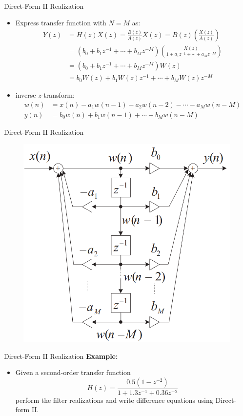 \documentclass[pdflatex,compress,mathserif]{beamer}
\begin{document}
\begin{frame}{Direct-Form II Realization}
	\begin{itemize}
		\item Express transfer function with $N = M$ as:
		\begin{align*}
      Y(z) &= H(z) X(z) = \frac{B(z)}{A(z)} X(z) = B(z)\left( \frac{X(z)}{A(z)} \right) \\
      &= (b_0 + b_1 z^{-1} + \cdots + b_M z^{-M}) \left( \frac{X(z)}{1 + a_1 z^{-1} + \cdots + a_M z^{-M}} \right) \\
      &= (b_0 + b_1 z^{-1} + \cdots + b_M z^{-M}) W(z) \\
      &= b_0 W(z) + b_1 W(z) z^{-1} + \cdots + b_M W(z) z^{-M}
    \end{align*}
    \item inverse $z$-transform:
    \begin{align*}
      w(n) &= x(n) - a_1 w(n-1) - a_2 w(n-2) - \cdots - a_M w(n-M) \\
      y(n) &= b_0 w(n) + b_1 w(n-1) + \cdots + b_M w(n-M)
    \end{align*}
	\end{itemize}
\end{frame}

\begin{frame}{Direct-Form II Realization}
    \begin{figure}
      \centering
			\includegraphics[width=0.6\linewidth]{./img/img04.png}
		\end{figure}
\end{frame}

\begin{frame}{Direct-Form II Realization}
  \textbf{Example:}
  \begin{itemize}
    \item Given a second-order transfer function $$ H(z) = \frac{0.5(1-z^{-2})}{1 + 1.3z^{-1} + 0.36 z^{-2}} $$ perform the filter realizations and write difference equations using Direct-form II.
  \end{itemize}
\end{frame}
\end{document}
